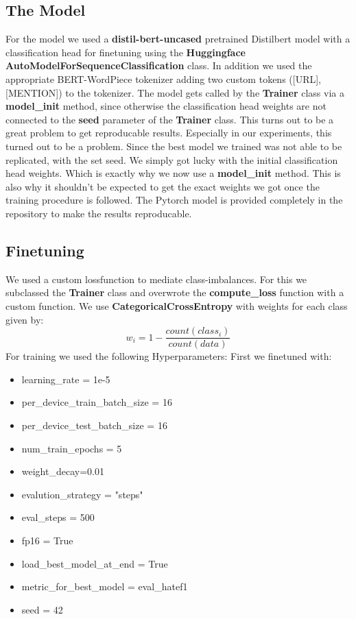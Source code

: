 \documentclass[11pt,a4paper]{article}
\begin{document}
\subsection{The Model}
For the model we used a \textbf{distil-bert-uncased} pretrained Distilbert model with a classification head for finetuning
using the \textbf{Huggingface} \textbf{AutoModelForSequenceClassification} class. In addition we used the appropriate BERT-WordPiece 
tokenizer adding two custom tokens ([URL],[MENTION]) to the tokenizer.
The model gets called by the \textbf{Trainer} class via a \textbf{model\_init} method, since otherwise the classification head
weights are not connected to the \textbf{seed} parameter of the \textbf{Trainer} class.
This turns out to be a great problem to get reproducable results.
Especially in our experiments, this turned out to be a problem. 
Since the best model we trained was not able to be replicated,
with the set seed. We simply got lucky with the initial classification head weights.
Which is exactly why we now use a \textbf{model\_init} method.
This is also why it shouldn't be expected to get the exact weights we got once the training procedure is followed.
The Pytorch model is provided completely in the repository to make the results reproducable.

\subsection{Finetuning}
We used a custom lossfunction to mediate class-imbalances.
For this we subclassed the \textbf{Trainer} class and overwrote the \textbf{compute\_loss} function with a custom function.
We use \textbf{CategoricalCrossEntropy} with weights for each class given by:
$$ w_i = 1 - \frac{count(class_i)}{count(data)}$$
For training we used the following Hyperparameters:
First we finetuned with: 
\begin{itemize}
    \setlength{\itemsep}{0.5pt}
    \item learning\_rate = 1e-5
    \item per\_device\_train\_batch\_size = 16
    \item per\_device\_test\_batch\_size = 16
    \item num\_train\_epochs = 5
    \item weight\_decay=0.01
    \item evalution\_strategy = "steps"
    \item eval\_steps = 500
    \item fp16 = True
    \item load\_best\_model\_at\_end = True
    \item metric\_for\_best\_model = eval\_hatef1
    \item seed = 42
\end{itemize}
\end{document}
